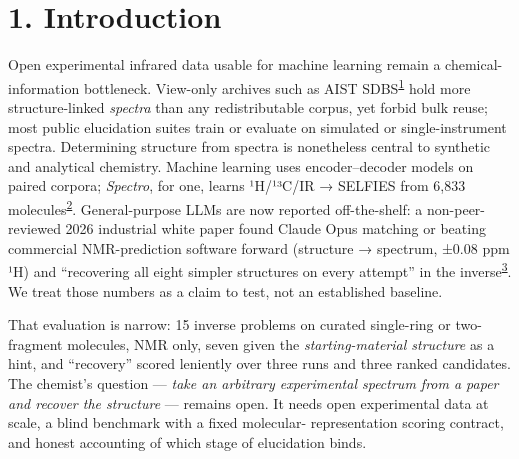 \documentclass[
  10pt,
]{article}
\begin{document}
\hypertarget{introduction}{%
\section{1. Introduction}\label{introduction}}

Open experimental infrared data usable for machine learning remain a
chemical-information bottleneck. View-only archives such as AIST
SDBS\textsuperscript{\protect\hyperlink{ref-sdbs}{1}} hold more
structure-linked \emph{spectra} than any redistributable corpus, yet
forbid bulk reuse; most public elucidation suites train or evaluate on
simulated or single-instrument spectra. Determining structure from
spectra is nonetheless central to synthetic and analytical chemistry.
Machine learning uses encoder--decoder models on paired corpora;
\emph{Spectro}, for one, learns ¹H/¹³C/IR → SELFIES from 6,833
molecules\textsuperscript{\protect\hyperlink{ref-chacko2024spectro}{2}}.
General-purpose LLMs are now reported off-the-shelf: a non-peer-reviewed
2026 industrial white paper found Claude Opus matching or beating
commercial NMR-prediction software forward (structure → spectrum, ±0.08
ppm ¹H) and ``recovering all eight simpler structures on every attempt''
in the
inverse\textsuperscript{\protect\hyperlink{ref-kamber2026chemist}{3}}.
We treat those numbers as a claim to test, not an established baseline.

That evaluation is narrow: 15 inverse problems on curated single-ring or
two-fragment molecules, NMR only, seven given the
\emph{starting-material structure} as a hint, and ``recovery'' scored
leniently over three runs and three ranked candidates. The chemist's
question --- \emph{take an arbitrary experimental spectrum from a paper
and recover the structure} --- remains open. It needs open experimental
data at scale, a blind benchmark with a fixed molecular- representation
scoring contract, and honest accounting of which stage of elucidation
binds.
\end{document}
